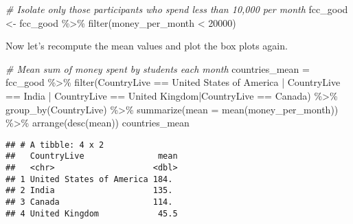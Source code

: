 \documentclass[
]{article}
\newenvironment{Shaded}{\begin{snugshade}}{\end{snugshade}}
\newcommand{\AttributeTok}[1]{\textcolor[rgb]{0.77,0.63,0.00}{#1}}
\newcommand{\CommentTok}[1]{\textcolor[rgb]{0.56,0.35,0.01}{\textit{#1}}}
\newcommand{\DecValTok}[1]{\textcolor[rgb]{0.00,0.00,0.81}{#1}}
\newcommand{\FunctionTok}[1]{\textcolor[rgb]{0.00,0.00,0.00}{#1}}
\newcommand{\NormalTok}[1]{#1}
\newcommand{\OtherTok}[1]{\textcolor[rgb]{0.56,0.35,0.01}{#1}}
\newcommand{\SpecialCharTok}[1]{\textcolor[rgb]{0.00,0.00,0.00}{#1}}
\newcommand{\StringTok}[1]{\textcolor[rgb]{0.31,0.60,0.02}{#1}}
\begin{document}
\begin{Shaded}
\begin{Highlighting}[]
\CommentTok{\# Isolate only those participants who spend less than 10,000 per month}
\NormalTok{fcc\_good  }\OtherTok{\textless{}{-}}\NormalTok{ fcc\_good }\SpecialCharTok{\%\textgreater{}\%} 
  \FunctionTok{filter}\NormalTok{(money\_per\_month }\SpecialCharTok{\textless{}} \DecValTok{20000}\NormalTok{)}
\end{Highlighting}
\end{Shaded}

Now let's recompute the mean values and plot the box plots again.

\begin{Shaded}
\begin{Highlighting}[]
\CommentTok{\# Mean sum of money spent by students each month}
\NormalTok{countries\_mean }\OtherTok{=}\NormalTok{ fcc\_good }\SpecialCharTok{\%\textgreater{}\%} 
  \FunctionTok{filter}\NormalTok{(CountryLive }\SpecialCharTok{==} \StringTok{\textquotesingle{}United States of America\textquotesingle{}} \SpecialCharTok{|}\NormalTok{ CountryLive }\SpecialCharTok{==} \StringTok{\textquotesingle{}India\textquotesingle{}} \SpecialCharTok{|}\NormalTok{ CountryLive }\SpecialCharTok{==} \StringTok{\textquotesingle{}United Kingdom\textquotesingle{}}\SpecialCharTok{|}\NormalTok{CountryLive }\SpecialCharTok{==} \StringTok{\textquotesingle{}Canada\textquotesingle{}}\NormalTok{) }\SpecialCharTok{\%\textgreater{}\%}
  \FunctionTok{group\_by}\NormalTok{(CountryLive) }\SpecialCharTok{\%\textgreater{}\%}
  \FunctionTok{summarize}\NormalTok{(}\AttributeTok{mean =} \FunctionTok{mean}\NormalTok{(money\_per\_month)) }\SpecialCharTok{\%\textgreater{}\%}
  \FunctionTok{arrange}\NormalTok{(}\FunctionTok{desc}\NormalTok{(mean))}
\NormalTok{countries\_mean}
\end{Highlighting}
\end{Shaded}

\begin{verbatim}
## # A tibble: 4 x 2
##   CountryLive               mean
##   <chr>                    <dbl>
## 1 United States of America 184. 
## 2 India                    135. 
## 3 Canada                   114. 
## 4 United Kingdom            45.5
\end{verbatim}
\end{document}
